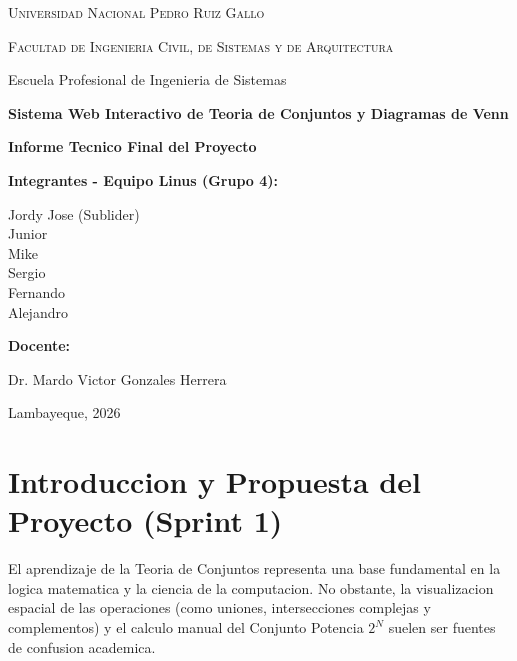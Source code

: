 \documentclass[12pt,a4paper]{article}
\begin{document}
\begin{titlepage}
    \centering
    \vspace*{2cm}
    {\scshape\LARGE Universidad Nacional Pedro Ruiz Gallo \par}
    \vspace{1cm}
    {\scshape\Large Facultad de Ingenieria Civil, de Sistemas y de Arquitectura \par}
    \vspace{0.5cm}
    {\large Escuela Profesional de Ingenieria de Sistemas \par}
    \vspace{1.5cm}
    
    {\Huge\bfseries Sistema Web Interactivo de Teoria de Conjuntos y Diagramas de Venn \par}
    \vspace{1cm}
    {\Large\bfseries Informe Tecnico Final del Proyecto \par}
    \vspace{2cm}
    
    {\large\bfseries Integrantes - Equipo Linus (Grupo 4):\par}
    \vspace{0.3cm}
    {\large
    Jordy Jose (Sublider) \\
    Junior \\
    Mike \\
    Sergio \\
    Fernando \\
    Alejandro \par}
    
    \vspace{2cm}
    {\large\bfseries Docente:\par}
    {\large Dr. Mardo Victor Gonzales Herrera \par}
    
    \vfill
    {\large Lambayeque, 2026 \par}
\end{titlepage}

\tableofcontents
\newpage

\section{Introduccion y Propuesta del Proyecto (Sprint 1)}
El aprendizaje de la Teoria de Conjuntos representa una base fundamental en la logica matematica y la ciencia de la computacion. No obstante, la visualizacion espacial de las operaciones (como uniones, intersecciones complejas y complementos) y el calculo manual del Conjunto Potencia $2^N$ suelen ser fuentes de confusion academica.
\end{document}
